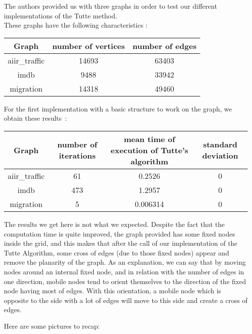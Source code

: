 
The authors provided us with three graphs in order to test our
different implementations of the Tutte method.\\

These graphs have the following characteristics :

\begin{center}
\begin{tabular}{|c|c|c|}
\hline
Graph & number of vertices & number of edges \\
\hline
aiir\_traffic & 14693 & 63403\\
imdb & 9488 & 33942\\
migration & 14318 & 49460\\
\hline
\end{tabular}
\end{center}


For the first implementation with a basic structure to
work on the graph, we obtain these results~:

\begin{center}
\begin{tabular}{|c|c|c|c|}
\hline
Graph & number of iterations & mean time of execution of Tutte's algorithm & standard deviation\\
\hline
aiir\_traffic & 61 & 0.2526 & 0\\
imdb & 473 & 1.2957 & 0\\
migration & 5 & 0.006314 & 0\\
\hline

\end{tabular}
\end{center}

The results we get here is not what we expected. Despite the fact that the computation time is quite improved, the graph provided has some fixed nodes inside the grid, and this makes that after the call of our implementation of the Tutte Algorithm, some cross of edges (due to those fixed nodes) appear and remove the planarity of the graph. As an explanation, we can say that by moving nodes around an internal fixed node, and in relation with the number of edges in one direction, mobile nodes tend to orient themselves to the direction of the fixed node having most of edges. With this orientation, a mobile node which is opposite to the side with a lot of edges will move to this side and create a cross of edges.

Here are some pictures to recap:
